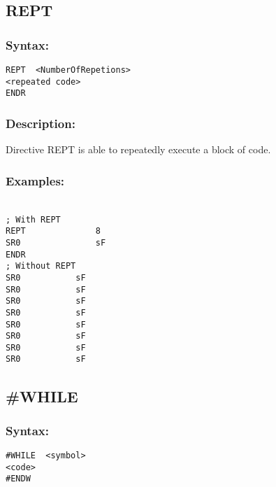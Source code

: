     \subsection{REPT}
        \subsubsection{Syntax:}
            \verb'REPT  <NumberOfRepetions>'\\
            \verb'<repeated code>'\\
            \verb'ENDR'

        \subsubsection{Description:}
            Directive REPT is able to repeatedly execute a block of code.

        \subsubsection{Examples:}
        {
            ~\\
            \usecodefont
                \verb'; With REPT'\\
                \verb'REPT              8'\\
                \verb'SR0               sF'\\
                \verb'ENDR'\\
                \verb'; Without REPT'\\
                \verb'SR0           sF'\\
                \verb'SR0           sF'\\
                \verb'SR0           sF'\\
                \verb'SR0           sF'\\
                \verb'SR0           sF'\\
                \verb'SR0           sF'\\
                \verb'SR0           sF'\\
                \verb'SR0           sF'\\
        }

    \subsection{\#WHILE}
        \subsubsection{Syntax:}
            \verb'#WHILE  <symbol>'\\
            \verb'<code>'\\
            \verb'#ENDW'

